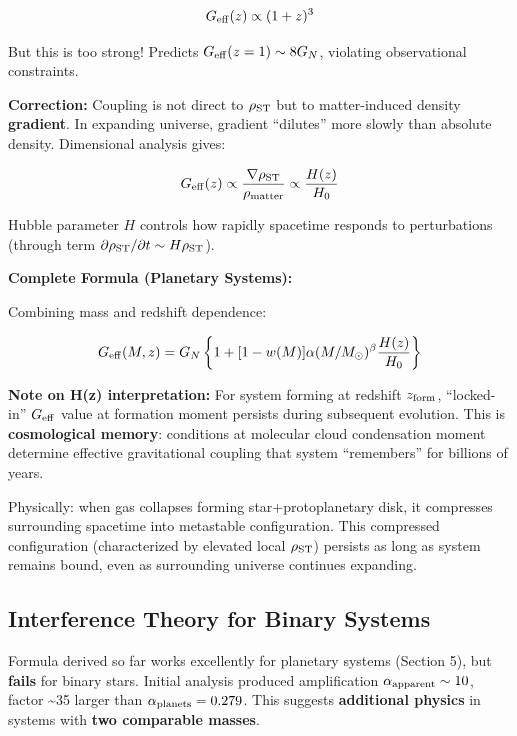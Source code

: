 \documentclass[11pt,a4paper]{article}
\begin{document}
\[G_{\rm eff}(z) \propto (1+z)^3\]

But this is too strong! Predicts \(G_{\rm eff}(z=1) \sim 8 G_N\),
violating observational constraints.

\textbf{Correction:} Coupling is not direct to \(\rho_{\rm ST}\) but to
matter-induced density \textbf{gradient}. In expanding universe,
gradient ``dilutes'' more slowly than absolute density. Dimensional
analysis gives:

\[G_{\rm eff}(z) \propto \frac{\nabla \rho_{\rm ST}}{\rho_{\rm matter}} \propto \frac{H(z)}{H_0}\]

Hubble parameter \(H\) controls how rapidly spacetime responds to
perturbations (through term
\(\partial \rho_{\rm ST}/\partial t \sim H \rho_{\rm ST}\)).

\textbf{Complete Formula (Planetary Systems):}

Combining mass and redshift dependence:

\[G_{\rm eff}(M,z) = G_N \left\{1 + [1-w(M)] \alpha (M/M_\odot)^\beta \frac{H(z)}{H_0}\right\}\]

\textbf{Note on H(z) interpretation:} For system forming at redshift
\(z_{\rm form}\), ``locked-in'' \(G_{\rm eff}\) value at formation
moment persists during subsequent evolution. This is
\textbf{cosmological memory}: conditions at molecular cloud condensation
moment determine effective gravitational coupling that system
``remembers'' for billions of years.

Physically: when gas collapses forming star+protoplanetary disk, it
compresses surrounding spacetime into metastable configuration. This
compressed configuration (characterized by elevated local
\(\rho_{\rm ST}\)) persists as long as system remains bound, even as
surrounding universe continues expanding.

\hypertarget{interference-theory-for-binary-systems}{%
\subsection{Interference Theory for Binary
Systems}\label{interference-theory-for-binary-systems}}

Formula derived so far works excellently for planetary systems (Section
5), but \textbf{fails} for binary stars. Initial analysis produced
amplification \(\alpha_{\rm apparent} \sim 10\), factor
\textasciitilde35 larger than \(\alpha_{\rm planets} = 0.279\). This
suggests \textbf{additional physics} in systems with \textbf{two
comparable masses}.
\end{document}
